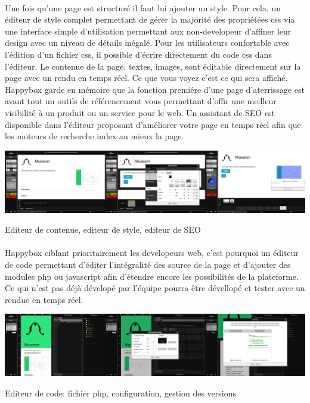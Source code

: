 \documentclass[11pt, a4paper ]{article}
\begin{document}
\begin{spacing}{1.5}
\paragraph{} %
Une fois qu'une page est structuré il faut lui ajouter un style. Pour cela, un éditeur de style complet permettant de gérer la majorité des propriétées css via une interface simple d'utilisation permettant aux non-developeur d'affiner leur design avec un niveau de détails inégalé. Pour les utilisateurs confortable avec l'édition d'un fichier css, il possible d'écrire directement du code css dans l'éditeur.
Le contenue de la page, textes, images, sont éditable directement sur la page avec un rendu en temps réel. Ce que vous voyez c'est ce qui sera affiché.
Happybox garde en mémoire que la fonction premiére d'une page d'aterrissage est avant tout un outils de référencement vous permettant d'offir une meilleur visibilité à un produit ou un service pour le web. Un assistant de SEO est disponible dans l'éditeur proposant d'améliorer votre page en temps réel afin que les moteurs de recherche index au mieux la page.
\begin{center}
	\includegraphics[width=\textwidth]{images/HBscreen/contenueStyleSeo.png}
	\caption{Editeur de contenue, editeur de style, editeur de SEO}
\end{center}

\paragraph{} %
Happybox ciblant prioritairement les developeurs web, c'est pourquoi un éditeur de code permettant d'éditer l'intégralité des source de la page et d'ajouter des modules php ou javascript afin d'étendre encore les possibilités de la plateforme. Ce qui n'est pas déjà dévelopé par l'équipe pourra être dévellopé et tester avec un rendue en temps réel.
\begin{center}
	\includegraphics[width=\textwidth]{images/HBscreen/codeManager.png}
	\caption{Editeur de code: fichier php, configuration, gestion des versions}
\end{center}


\end{spacing}
\end{document}
